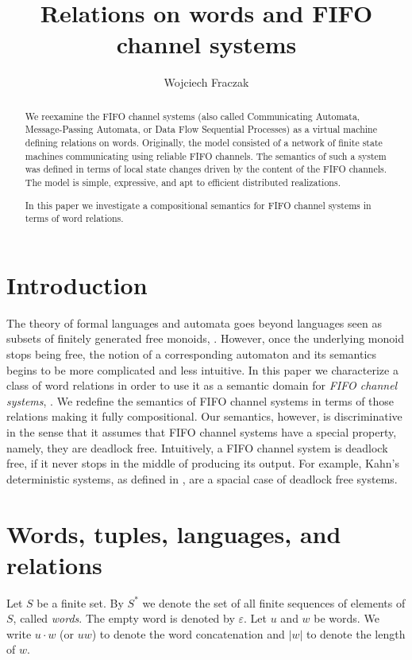 \documentclass{llncs}
\title{Relations on words and FIFO channel systems}
\author{Wojciech Fraczak}
\institute{Universit\'e du Qu\'ebec en Outaouais, 
  Gatineau Qu\'ebec J8X 3X7, Canada
  \email{fraczak@uqo.ca}
}
\begin{document}
\maketitle
\begin{abstract}
  We reexamine the FIFO channel systems (also called Communicating
  Automata, Message-Passing Automata, or Data Flow Sequential
  Processes) as a virtual machine defining relations on
  words. Originally, the model consisted of a network of finite state
  machines communicating using reliable FIFO channels. The semantics
  of such a system was defined in terms of local state changes driven
  by the content of the FIFO channels. The model is simple,
  expressive, and apt to efficient distributed realizations.

  In this paper we investigate a compositional semantics for FIFO
  channel systems in terms of word relations. 
\end{abstract}

\section{Introduction}

The theory of formal languages and automata goes beyond languages seen
as subsets of finitely generated free monoids,
\cite{sakarovitch-03}. However, once the underlying monoid stops being
free, the notion of a corresponding automaton and its semantics begins
to be more complicated and less intuitive. In this paper we
characterize a class of word relations in order to use it as a
semantic domain for \emph{FIFO channel systems}, \cite{bz-83}. We
redefine the semantics of FIFO channel systems in terms of those
relations making it fully compositional. Our semantics, however, is
discriminative in the sense that it assumes that FIFO channel systems
have a special property, namely, they are deadlock free.  Intuitively,
a FIFO channel system is deadlock free, if it never stops in the
middle of producing its output. For example,
Kahn's deterministic systems, as defined in \cite{kahn-74}, are a spacial
case of deadlock free systems.

\section{Words, tuples, languages, and relations}

Let $S$ be a finite set. By $S^\ast$ we denote the set of all finite
sequences of elements of $S$, called \emph{words}. The empty word is
denoted by $\varepsilon$. Let $u$ and $w$ be words. We write $u\cdot
w$ (or $uw$) to denote the word concatenation and $|w|$ to denote the
length of $w$. 
\end{document}
